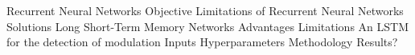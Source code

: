 
Recurrent Neural Networks
    Objective
    Limitations of Recurrent Neural Networks
    Solutions
Long Short-Term Memory Networks
    Advantages
    Limitations
An LSTM for the detection of modulation
    Inputs
    Hyperparameters
    Methodology
    Results?
